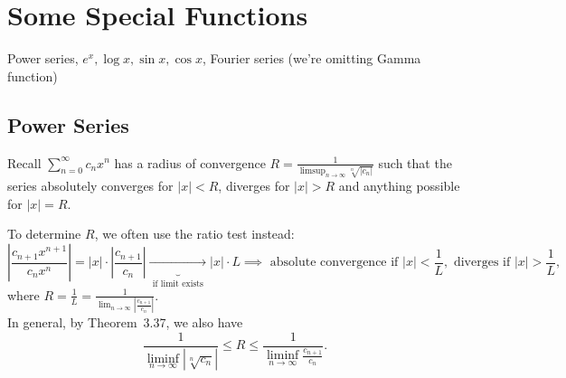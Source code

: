 \chapter{Some Special Functions}
Power series, $e^{x}, \log{x},\sin{x},\cos{x}$, Fourier series (we're omitting Gamma function)

\section{Power Series}
Recall $\sum_{n=0}^{\infty}{c_n{x^{n}}}$ has a radius of convergence $R=\frac{1}{\limsup_{n\to \infty}{\sqrt[n]{\left|c_{n}\right| }}}$ such that the series absolutely converges for $\left|x\right| < R$, diverges for $\left|x\right| >R$ and anything possible for $\left|x\right| =R$.

\begin{remark}
	To determine $R$, we often use the ratio test instead:
	\[
		\left|\frac{c_{n+1}x^{n+1}}{c_nx^{n}}\right| =\left|x\right| \cdot \left|\frac{c_{n+1}}{c_n}\right|\underbrace{\to}_{\text{ if limit exists } } \left|x\right| \cdot L\implies \text{ absolute convergence if } \left|x\right| <\frac{1}{L}, \text{ diverges if }  \left|x\right| >\frac{1}{L}
		,\] where $R=\frac{1}{L}=\frac{1}{\lim_{n\to \infty}{\left|\frac{c_{n+1}}{c_n}\right| }}$.\\
	In general, by Theorem~3.37, we also have \[
		\frac{1}{\liminf_{n\to \infty}{\left|\sqrt[n]{c_n}\right|}}\le R\le \frac{1}{\liminf_{n\to \infty}{\frac{c_{n+1}}{c_n}}}
		.\]
\end{remark}

